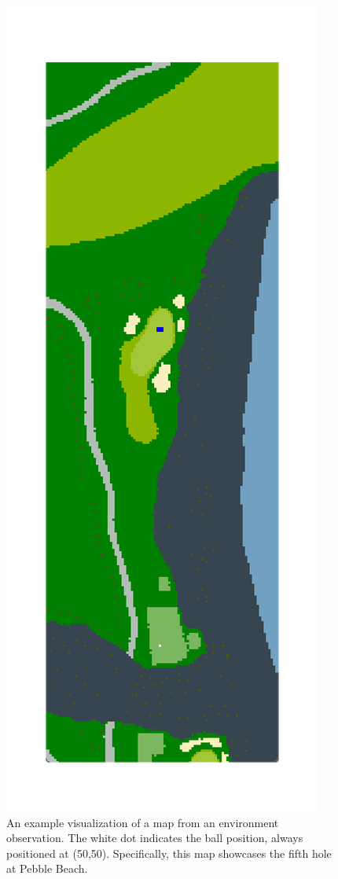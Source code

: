 \documentclass{kththesis}
\begin{document}
\begin{figure}
    \centering
    \includegraphics[height=0.5\textheight]{golf_observation_visualization.png}
    \caption{An example visualization of a map from an environment observation. The white dot indicates the ball position, always positioned at (50,50). Specifically, this map showcases the fifth hole at Pebble Beach.}
    \label{fig:observation}
\end{figure}
\end{document}

